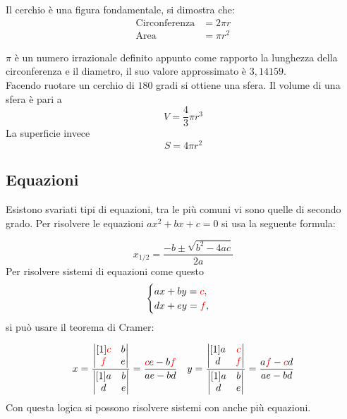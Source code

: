 Il cerchio è una figura fondamentale, si dimostra che: 
\begin{align*}
  \text{Circonferenza}&=2\pi r\\
  \text{Area}&=\pi r^2
\end{align*}
\begin{center}     
\end{center}
$\pi$ è un numero irrazionale definito appunto come rapporto la lunghezza della circonferenza e il 
diametro, il suo valore approssimato è $3,14159$. \\	
Facendo ruotare un cerchio di $180$ gradi si ottiene una sfera. Il volume di una sfera è pari a
\begin{equation*}
  V=\frac{4}{3}\pi r^3
\end{equation*}
La superficie invece
\begin{equation*}
  S = 4\pi r^2
\end{equation*}

\subsection{Equazioni}
Esistono svariati tipi di equazioni, tra le più comuni vi sono quelle di secondo grado. Per risolvere le equazioni   $ax^{2}+bx+c=0$  
si usa la seguente formula:

\begin{equation*}
  x_{1/2}={\frac{-b\pm\sqrt{b^{2}-4ac}}{2a}}
\end{equation*}
Per risolvere sistemi di equazioni come questo
\begin{equation*}
  \begin{cases}  ax+by= \textcolor{red}{c}, \\ dx+ey= \textcolor{red}{f},\\ 
  \end{cases}
\end{equation*}
si può usare il teorema di Cramer:

\begin{equation*}
  x=\dfrac{\begin{vmatrix}[1]
      \textcolor{red}{c} & b \\  
      \textcolor{red}{f} & e 
    \end{vmatrix}}{\begin{vmatrix}[1] 
  a & b \\ d & e \end{vmatrix}}= 
  \dfrac{\textcolor{red}{c}e-b\textcolor{red}{f}}{ae-bd}     \quad 
y=\dfrac{\begin{vmatrix}[1]  a &\textcolor{red}{c} \\ d &  \textcolor{red}{f} \end{vmatrix}}
{\begin{vmatrix}[1]  a & b \\ d & e \end{vmatrix}}= 
  \dfrac{a \textcolor{red}{f}- \textcolor{red}{c}d}{ae-bd}
\end{equation*}
Con questa logica si possono risolvere sistemi con anche più equazioni.


